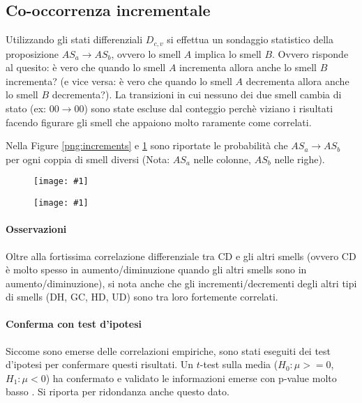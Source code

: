 \documentclass[a4paper,11pt,oneside, table]{article}
\newcommand{\putsubimage}[5] {
  \begin{minipage}{{#4}\linewidth}
    \centering
    \texttt{[image: \#1]}
    \caption{#2}\label{#3}
  \end{minipage}
}
\newcommand{\putimagecouple}[2] {
  \begin{figure}[!htb]
    \centering
    #1
    \hspace{0.5cm}
    #2
  \end{figure}
}
\begin{document}
  \subsection{Co-occorrenza incrementale}
  Utilizzando gli stati differenziali $D_{c,v}$ si effettua un sondaggio statistico della proposizione $AS_{a} \rightarrow AS_{b}$, ovvero lo smell $A$ implica lo smell $B$. Ovvero risponde al quesito: \`e vero che quando lo smell $A$ incrementa allora anche lo smell $B$ incrementa? (e vice versa: \`e vero che quando lo smell $A$ decrementa allora anche lo smell $B$ decrementa?). La transizioni in cui nessuno dei due smell cambia di stato (ex: $00 \rightarrow 00$) sono state escluse dal conteggio perch\`e viziano i risultati facendo figurare gli smell che appaiono molto raramente come correlati.

  Nella Figure \ref{png:increments} e \ref{png:decrements} sono riportate le probabilit\`a che $AS_{a} \rightarrow AS_{b}$ per ogni coppia di smell diversi (Nota: $AS_{a}$ nelle colonne, $AS_{b}$ nelle righe).
  
  \putimagecouple
  {\putsubimage{images/increments.png}{}{png:increments}{0.45}{1}}
  {\putsubimage{images/decrements.png}{}{png:decrements}{0.45}{1}}

  \paragraph{Osservazioni}
  Oltre alla fortissima correlazione differenziale tra CD e gli altri smells (ovvero CD \`e molto spesso in aumento/diminuzione quando gli altri smells sono in aumento/diminuzione), si nota anche che gli incrementi/decrementi degli altri tipi di smells (DH, GC, HD, UD) sono tra loro fortemente correlati.

  \paragraph{Conferma con test d'ipotesi}

  Siccome sono emerse delle correlazioni empiriche, sono stati eseguiti dei test d'ipotesi per confermare questi risultati. Un $t$-test \cite{sun2020microbiome} sulla media ($H_0: \mu >= 0$, $H_1: \mu < 0$) ha confermato e validato le informazioni emerse con p-value molto basso \cite{head2015extent}. Si riporta per ridondanza anche questo dato.
\end{document}
